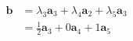 \documentclass[preview]{standalone}
\renewcommand{\vec}{\mathbf}
\begin{document}
\begin{center}
\begin{align*}\vec{b}&=\lambda_3\vec{a}_3+\lambda_4\vec{a}_2+\lambda_5\vec{a}_3\\&=\frac{1}{2}\vec{a}_3+0\vec{a}_4+1\vec{a}_5\end{align*}
\end{center}
\end{document}
